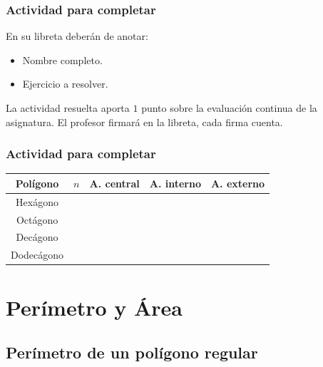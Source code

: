 \documentclass[14pt]{beamer}
\begin{document}
\begin{frame}
\frametitle{Actividad para completar}
En su libreta deberán de anotar:
\begin{itemize}
\item Nombre completo.
\item Ejercicio a resolver.
\end{itemize}
La actividad resuelta aporta $1$ punto sobre la evaluación continua de la asignatura. El profesor firmará en la libreta, cada firma cuenta.
\end{frame}
\begin{frame}
\frametitle{Actividad para completar}
\begin{table}
\centering
\begin{tabular}{c | c | c | c | c }
Polígono & $n$ & A. central & A. interno & A. externo \\ \hline
Hexágono & & & & \\ \hline
Octágono & & & & \\ \hline
Decágono & & & & \\ \hline
Dodecágono & & & & \\ \hline
\end{tabular}
\end{table}
\end{frame}

\section{Perímetro y Área}
\subsection{Perímetro de un polígono regular}
\end{document}
